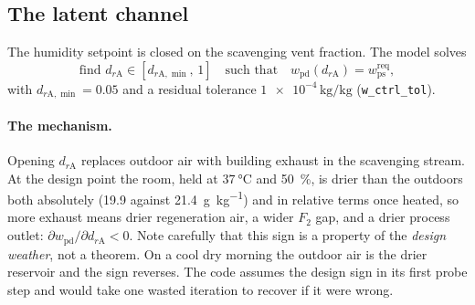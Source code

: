 \documentclass[11pt]{article}
\providecommand{\celsius}{\degreeCelsius}
\begin{document}
\subsection{The latent channel}
\label{sec:air:latent}

The humidity setpoint is closed on the scavenging vent fraction. The model
solves
\begin{equation}
\text{find } d_{r\mathrm{A}} \in [d_{r\mathrm{A},\min},\,1]
\quad\text{such that}\quad
w_{\mathrm{pd}}\!\left(d_{r\mathrm{A}}\right)
= w_{\mathrm{ps}}^{\mathrm{req}} ,
\label{eq:air:rA_solve}
\end{equation}
with $d_{r\mathrm{A},\min}=\num{0.05}$ and a residual tolerance
$\num{1e-4}\,\si{\kilogram\per\kilogram}$ (\texttt{w\_ctrl\_tol}).

\paragraph{The mechanism.} Opening $d_{r\mathrm{A}}$ replaces outdoor air with
building exhaust in the scavenging stream. At the design point the room, held
at $\SI{37}{\celsius}$ and \SI{50}{\percent}, is drier than the outdoors both
absolutely (\num{19.9} against \SI{21.4}{\gram\per\kilogram}) and in relative
terms once heated, so more exhaust means drier regeneration air, a wider $F_2$
gap, and a drier process outlet: $\partial w_{\mathrm{pd}}/\partial
d_{r\mathrm{A}}<0$. Note carefully that this sign is a property of the
\emph{design weather}, not a theorem. On a cool dry morning the outdoor air is
the drier reservoir and the sign reverses. The code assumes the design sign in
its first probe step and would take one wasted iteration to recover if it were
wrong.
\end{document}
